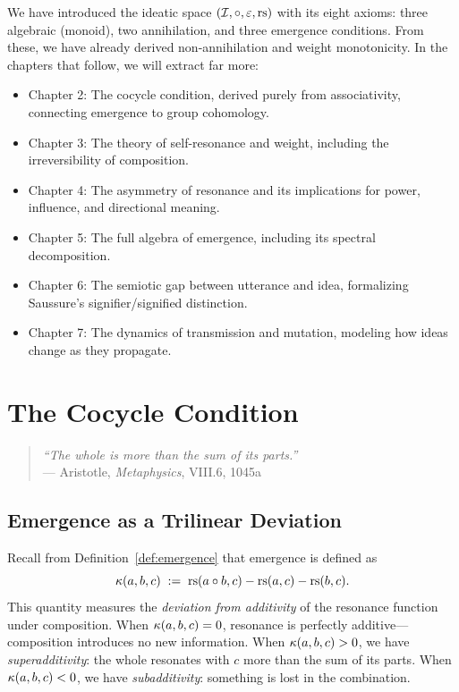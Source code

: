 We have introduced the ideatic space $(\mathcal{I}, \circ, \varepsilon, \mathrm{rs})$ with
its eight axioms: three algebraic (monoid), two annihilation, and three
emergence conditions. From these, we have already derived non-annihilation
and weight monotonicity. In the chapters that follow, we will extract
far more:
\begin{itemize}
    \item Chapter 2: The cocycle condition, derived purely from
          associativity, connecting emergence to group cohomology.
    \item Chapter 3: The theory of self-resonance and weight, including
          the irreversibility of composition.
    \item Chapter 4: The asymmetry of resonance and its implications for
          power, influence, and directional meaning.
    \item Chapter 5: The full algebra of emergence, including its spectral
          decomposition.
    \item Chapter 6: The semiotic gap between utterance and idea,
          formalizing Saussure's signifier/signified distinction.
    \item Chapter 7: The dynamics of transmission and mutation, modeling
          how ideas change as they propagate.
\end{itemize}



\chapter{The Cocycle Condition}

\begin{quote}
\textit{``The whole is more than the sum of its parts.''}\\
\hfill --- Aristotle, \textit{Metaphysics}, VIII.6, 1045a
\end{quote}

\section{Emergence as a Trilinear Deviation}

Recall from Definition~\ref{def:emergence} that emergence is defined as
\[
    \kappa(a, b, c) \;:=\; \mathrm{rs}(a \circ b, c) - \mathrm{rs}(a, c) - \mathrm{rs}(b, c).
\]
This quantity measures the \emph{deviation from additivity} of the resonance
function under composition. When $\kappa(a,b,c) = 0$, resonance is
perfectly additive---composition introduces no new information. When
$\kappa(a,b,c) > 0$, we have \emph{superadditivity}: the whole resonates
with $c$ more than the sum of its parts. When $\kappa(a,b,c) < 0$, we
have \emph{subadditivity}: something is lost in the combination.

